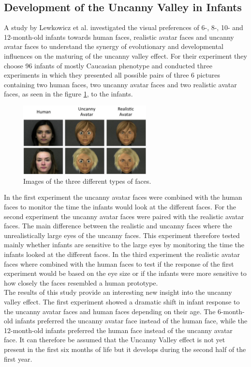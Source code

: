 \subsection{Development of the Uncanny Valley in Infants}
A study by Lewkowicz et al. \cite{uncanny_infants} investigated the visual preferences of 6-, 8-, 10- and 12-month-old infants towards human faces, realistic avatar faces and uncanny avatar faces to understand the synergy of evolutionary and developmental influences on the maturing of the uncanny valley effect. For their experiment they choose 96 infants of mostly Caucasian phenotype and conducted three experiments in which they presented all possible pairs of three 6 pictures containing two human faces, two uncanny avatar faces and two realistic avatar faces, as seen in the figure \ref{fig:uncannyInfants}, to the infants. 
\begin{figure} %
    \centering
    \includegraphics[width=0.6\textwidth]{graphics/uncanny_infants.png}
    \caption{Images of the three different types of faces.}
    \label{fig:uncannyInfants}
\end{figure}
In the first experiment the uncanny avatar faces were combined with the human faces to monitor the time the infants would look at the different faces. For the second experiment the uncanny avatar faces were paired with the realistic avatar faces. The main difference between the realistic and uncanny faces where the unrealistically large eyes of the uncanny faces. This experiment therefore tested mainly whether infants are sensitive to the large eyes by monitoring the time the infants looked at the different faces. In the third experiment the realistic avatar faces where combined with the human faces to test if the response of the first experiment would be based on the eye size or if the infants were more sensitive to how closely the faces resembled a human prototype.\\
The results of this study provide an interesting new insight into the uncanny valley effect. The first experiment showed a dramatic shift in infant response to the uncanny avatar faces and human faces depending on their age. The 6-month-old infants preferred the uncanny avatar face instead of the human face, while the 12-month-old infants preferred the human face instead of the uncanny avatar face. It can therefore be assumed that the Uncanny Valley effect is not yet present in the first six months of life but it develops during the second half of the first year.\\
